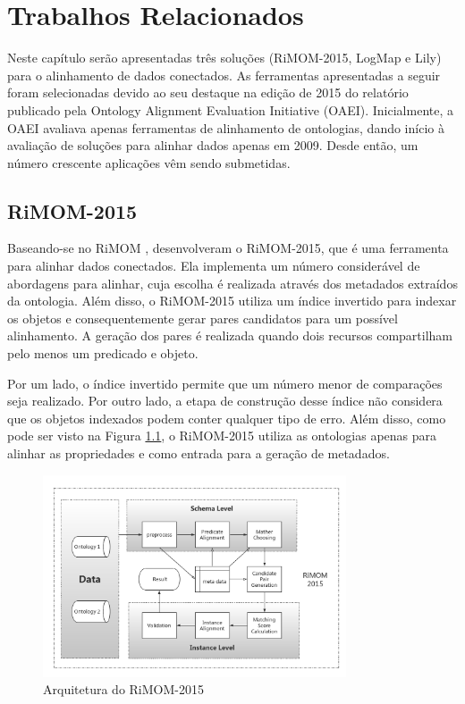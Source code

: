 \chapter{Trabalhos Relacionados}

Neste capítulo serão apresentadas três soluções (RiMOM-2015, LogMap e Lily) para o alinhamento de dados conectados. As ferramentas apresentadas a seguir foram selecionadas devido ao seu destaque na edição de 2015 do relatório publicado pela Ontology Alignment Evaluation Initiative (OAEI). Inicialmente, a OAEI avaliava apenas ferramentas de alinhamento de ontologias, dando início à avaliação de soluções para alinhar dados apenas em 2009. Desde então, um número crescente aplicações vêm sendo submetidas.

\section*{RiMOM-2015}
Baseando-se no RiMOM \cite{li2009rimom},  desenvolveram o RiMOM-2015, que é uma ferramenta para alinhar dados conectados. Ela implementa um número considerável de abordagens para alinhar, cuja escolha é realizada através dos metadados extraídos da ontologia. Além disso, o RiMOM-2015 utiliza um índice invertido para indexar os objetos e consequentemente gerar pares candidatos para um possível alinhamento. A geração dos pares é realizada quando dois recursos compartilham pelo menos um predicado e objeto.

Por um lado, o índice invertido permite que um número menor de comparações seja realizado. Por outro lado, a etapa de 
construção desse índice não considera que os objetos indexados podem conter qualquer tipo de erro. Além disso, como pode ser visto na Figura \ref{fig:rimom}, o RiMOM-2015 utiliza as ontologias apenas para alinhar as propriedades e como entrada para a geração de metadados.

\begin{figure}[!ht]
	\centering
	\includegraphics[width=0.8\textwidth]{./imagens/RiMOM_2015.png}
    \caption{Arquitetura do RiMOM-2015}
	\label{fig:rimom}
\end{figure}

